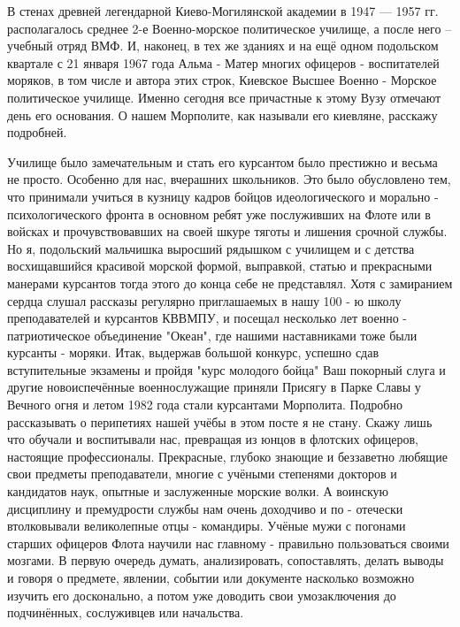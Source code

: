 \raggedcolumns
\begin{multicols}{2} %
\setlength{\parindent}{0pt}




\end{multicols} %

В стенах древней легендарной Киево-Могилянской академии в 1947 — 1957 гг.
располагалось среднее 2-е Военно-морское политическое училище, а после него –
учебный отряд ВМФ. И, наконец, в тех же зданиях и на ещё одном подольском
квартале с 21 января 1967 года Альма - Матер многих офицеров - воспитателей
моряков, в том числе и автора этих строк, Киевское Высшее Военно - Морское
политическое училище. Именно сегодня все причастные к этому Вузу отмечают день
его основания. О нашем Морполите, как называли его киевляне, расскажу
подробней.

Училище было замечательным и стать его курсантом было престижно и весьма не
просто. Особенно для нас, вчерашних школьников. Это было обусловлено тем, что
принимали учиться в кузницу кадров бойцов идеологического и морально -
психологического фронта в основном ребят уже послуживших на Флоте или в войсках
и прочувствовавших на своей шкуре тяготы и лишения срочной службы. Но я,
подольский мальчишка выросший рядышком с училищем и с детства восхищавшийся
красивой морской формой, выправкой, статью и прекрасными манерами курсантов
тогда этого до конца себе не представлял. Хотя с замиранием сердца слушал
рассказы регулярно приглашаемых в нашу 100 - ю школу преподавателей и курсантов
КВВМПУ, и посещал несколько лет военно - патриотическое объединение "Океан",
где нашими наставниками тоже были курсанты - моряки. Итак, выдержав большой
конкурс, успешно сдав вступительные экзамены и пройдя "курс молодого бойца" Ваш
покорный слуга и другие новоиспечённые военнослужащие приняли Присягу в Парке
Славы у Вечного огня и летом 1982 года стали курсантами Морполита. Подробно
рассказывать о перипетиях нашей учёбы в этом посте я не стану. Скажу лишь что
обучали и воспитывали нас, превращая из юнцов в флотских офицеров, настоящие
профессионалы. Прекрасные, глубоко знающие и беззаветно любящие свои предметы
преподаватели, многие с учёными степенями докторов и кандидатов наук, опытные и
заслуженные морские волки. А воинскую дисциплину и премудрости службы нам очень
доходчиво и по - отечески втолковывали великолепные отцы - командиры. Учёные
мужи с погонами старших офицеров Флота научили нас главному - правильно
пользоваться своими мозгами. В первую очередь думать, анализировать,
сопоставлять, делать выводы и говоря о предмете, явлении, событии или документе
насколько возможно изучить его досконально, а потом уже доводить свои
умозаключения до подчинённых, сослуживцев или начальства. 

